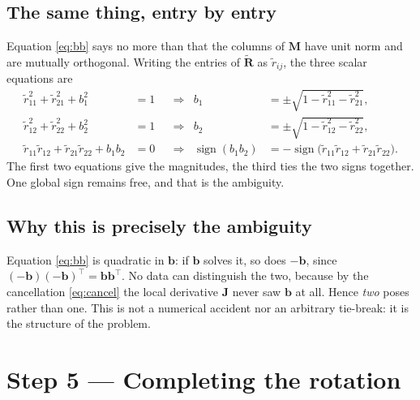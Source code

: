 \documentclass[11pt,a4paper]{article}
\theoremstyle{remark}
\newcommand{\Rtil}{\widetilde{\mathbf{R}}}
\newcommand{\Jmat}{\mathbf{J}}
\newcommand{\Mmat}{\mathbf{M}}
\newcommand{\bvec}{\mathbf{b}}
\begin{document}
\subsection{The same thing, entry by entry}

Equation \eqref{eq:bb} says no more than that the columns of $\Mmat$ have unit
norm and are mutually orthogonal. Writing the entries of $\Rtil$ as
$\tilde r_{ij}$, the three scalar equations are
\begin{align}
  \tilde r_{11}^2 + \tilde r_{21}^2 + b_1^2 &= 1
  &&\Longrightarrow&
  b_1 &= \pm\sqrt{1 - \tilde r_{11}^2 - \tilde r_{21}^2},
  \label{eq:b1} \\
  \tilde r_{12}^2 + \tilde r_{22}^2 + b_2^2 &= 1
  &&\Longrightarrow&
  b_2 &= \pm\sqrt{1 - \tilde r_{12}^2 - \tilde r_{22}^2},
  \label{eq:b2} \\
  \tilde r_{11}\tilde r_{12} + \tilde r_{21}\tilde r_{22} + b_1 b_2 &= 0
  &&\Longrightarrow&
  \operatorname{sign}(b_1 b_2)
  &= -\operatorname{sign}\big(
     \tilde r_{11}\tilde r_{12} + \tilde r_{21}\tilde r_{22}\big).
  \label{eq:b3}
\end{align}
The first two equations give the magnitudes, the third ties the two signs
together. One global sign remains free, and that is the ambiguity.

\subsection{Why this is precisely the ambiguity}

Equation \eqref{eq:bb} is quadratic in $\bvec$: if $\bvec$ solves it, so does
$-\bvec$, since $(-\bvec)(-\bvec)^{\top} = \bvec\bvec^{\top}$. No data can
distinguish the two, because by the cancellation \eqref{eq:cancel} the local
derivative $\Jmat$ never saw $\bvec$ at all. Hence \emph{two} poses rather than
one. This is not a numerical accident nor an arbitrary tie-break: it is the
structure of the problem.

\section{Step 5 --- Completing the rotation}
\end{document}
